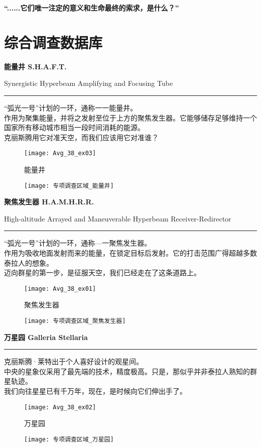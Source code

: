 \documentclass[openany]{book}
\begin{document}
\begin{center} \textbf{“......它们唯一注定的意义和生命最终的索求，是什么？”}\end{center} \par

\chapter{综合调查数据库}
\textbf{能量井 S.H.A.F.T.}\par
Synergistic Hyperbeam Amplifying and Focusing Tube \par\noindent\rule{\textwidth}{0.4pt}
“弧光一号”计划的一环，通称一一能量井。\\
作用为聚集能量，并将之发射至位于上方的聚焦发生器。它能够储存足够维持一个国家所有移动城市相当一段时间消耗的能源。\\
克丽斯腾用它对准天空，而我们应该用它对准谁？
\begin{figure}[h]
    \caption*{能量井}
    \centering
    \texttt{[image: Avg\_38\_ex03]}
\end{figure}
\begin{figure}[h]
    \centering
    \texttt{[image: 专项调查区域\_能量井]}
\end{figure}
\clearpage

\textbf{聚焦发生器 H.A.M.H.R.R.}\par
High-altitude Arrayed and Maneuverable Hyperbeam Receiver-Redirector \par\noindent\rule{\textwidth}{0.4pt}
“弧光一号”计划的一环，通称—一聚焦发生器。\\
作用为吸收地面发射而来的能量，在锁定目标后发射。它的打击范围广得超越多数泰拉人的想象。\\
迈向群星的第一步，是征服天空，我们已经走在了这条道路上。
\begin{figure}[h]
    \caption*{聚焦发生器}
    \centering
    \texttt{[image: Avg\_38\_ex01]}
\end{figure}
\begin{figure}[h]
    \centering
    \texttt{[image: 专项调查区域\_聚焦发生器]}
\end{figure}
\clearpage

\textbf{万星园 Galleria Stellaria}\par\noindent\rule{\textwidth}{0.4pt}
克丽斯腾·莱特出于个人喜好设计的观星间。\\
中央的星象仪采用了最先端的技术，精度极高。只是，那似乎并非泰拉人熟知的群星轨迹。\\
我们向往星星已有千万年，现在，是时候向它们伸出手了。
\begin{figure}[h]
    \caption*{万星园}
    \centering
    \texttt{[image: Avg\_38\_ex02]}
\end{figure}
\begin{figure}[h]
    \centering
    \texttt{[image: 专项调查区域\_万星园]}
\end{figure}
\clearpage
\end{document}
